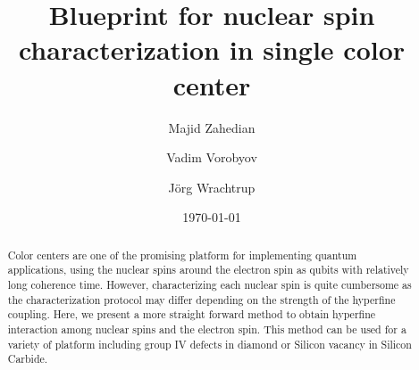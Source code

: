 \documentclass[%
 reprint,
superscriptaddress,
 amsmath,amssymb,
 aps,
]{revtex4-2}
\begin{document}

\title{Blueprint for nuclear spin characterization in single color center}%

\author{Majid Zahedian}


\author{Vadim Vorobyov}

 
\author{J\"org Wrachtrup}

\date{\today}%

\begin{abstract}
Color centers are one of the promising platform for implementing quantum applications, using the nuclear spins around the electron spin as qubits with relatively long coherence time. However, characterizing each nuclear spin is quite cumbersome as the characterization protocol may differ depending on the strength of the hyperfine coupling. Here, we present a more straight forward method to obtain hyperfine interaction among nuclear spins and the electron spin. This method can be used for a variety of platform including group IV defects in diamond or Silicon vacancy in Silicon Carbide.
\end{abstract}

\maketitle
\end{document}
